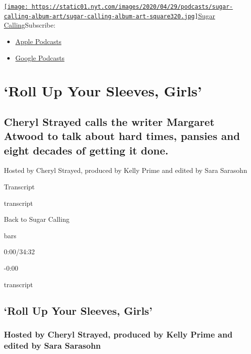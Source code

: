 \href{https://www.nytimes.com/column/sugar-calling}{\texttt{[image: https://static01.nyt.com/images/2020/04/29/podcasts/sugar-calling-album-art/sugar-calling-album-art-square320.jpg]}Sugar
Calling}Subscribe:

\begin{itemize}
\tightlist
\item
  \href{https://itunes.apple.com/us/podcast/id1505881384}{Apple
  Podcasts}
\item
  \href{https://podcasts.google.com/?feed=aHR0cHM6Ly9yc3MuYXJ0MTkuY29tL3N1Z2FyLWNhbGxpbmc\&ved=0CAUQrrcFahcKEwjA8Kyn09voAhUAAAAAHQAAAAAQBQ}{Google
  Podcasts}
\end{itemize}

\hypertarget{roll-up-your-sleeves-girls-1}{%
\section{`Roll Up Your Sleeves,
Girls'}\label{roll-up-your-sleeves-girls-1}}

\hypertarget{cheryl-strayed-calls-the-writer-margaret-atwood-to-talk-about-hard-times-pansies-and-eight-decades-of-getting-it-done-1}{%
\subsection{Cheryl Strayed calls the writer Margaret Atwood to talk
about hard times, pansies and eight decades of getting it
done.}\label{cheryl-strayed-calls-the-writer-margaret-atwood-to-talk-about-hard-times-pansies-and-eight-decades-of-getting-it-done-1}}

Hosted by Cheryl Strayed, produced by Kelly Prime and edited by Sara
Sarasohn

Transcript

transcript

Back to Sugar Calling

bars

0:00/34:32

-0:00

transcript

\hypertarget{roll-up-your-sleeves-girls-2}{%
\subsection{`Roll Up Your Sleeves,
Girls'}\label{roll-up-your-sleeves-girls-2}}

\hypertarget{hosted-by-cheryl-strayed-produced-by-kelly-prime-and-edited-by-sara-sarasohn-1}{%
\subsubsection{Hosted by Cheryl Strayed, produced by Kelly Prime and
edited by Sara
Sarasohn}\label{hosted-by-cheryl-strayed-produced-by-kelly-prime-and-edited-by-sara-sarasohn-1}}

